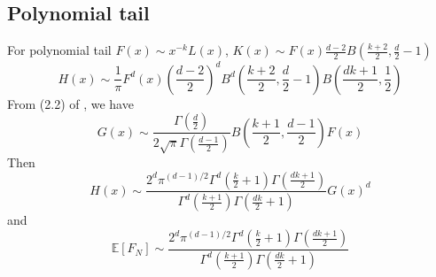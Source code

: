 \documentclass{article}
\def\E{\mathbb{E}}
\begin{document}
\subsection{Polynomial tail}
For polynomial tail $F(x) \sim x^{-k} L(x)$,
$K(x) \sim F(x) \frac{d-2}{2} B\left(\frac{k+2}{2}, \frac{d}{2}-1\right)$
\begin{equation}
    H(x)
    \sim \frac{1}{\pi} F^d(x) \left(\frac{d-2}{2}\right)^d
    B^d\left(\frac{k+2}{2}, \frac{d}{2}-1\right)
    B\left(\frac{dk+1}{2}, \frac{1}{2}\right)
\end{equation}
From (2.2) of \cite{dwyer1991convex},
we have
\begin{equation}
    G(x) \sim \frac{\Gamma(\frac{d}{2})}{2\sqrt{\pi} \Gamma(\frac{d-1}{2})}
    B\left(\frac{k+1}{2}, \frac{d-1}{2}\right) F(x)
\end{equation}
Then
\begin{equation}
    H(x) \sim \frac{2^d \pi^{(d-1)/2}\Gamma^d(\frac{k}{2}+1)
    \Gamma(\frac{dk+1}{2})}{
        \Gamma^d(\frac{k+1}{2}) \Gamma(\frac{dk}{2}+1)} G(x)^d
\end{equation}
and
\begin{equation}
    \E[F_N] \sim \frac{2^d \pi^{(d-1)/2}\Gamma^d(\frac{k}{2}+1)
    \Gamma(\frac{dk+1}{2})}{
        \Gamma^d(\frac{k+1}{2}) \Gamma(\frac{dk}{2}+1)}
\end{equation}
\end{document}

